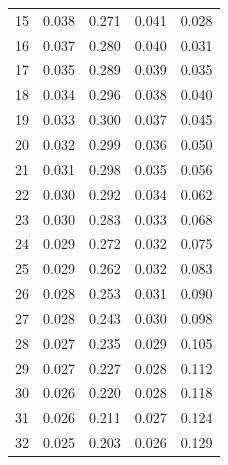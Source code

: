 \documentclass[letterpaper,12pt]{article}
\begin{document}
\begin{table}
\begin{center}
\begin{tabular}{ccccc}
         15        &         0.038               &    0.271  &            0.041                   &  0.028\\
         16         &         0.037               &    0.280  &            0.040                  &  0.031\\
         17        &         0.035               &    0.289  &            0.039                  & 0.035\\
         18        &         0.034               &    0.296  &            0.038                  & 0.040\\
         19         &         0.033               &    0.300  &            0.037                 & 0.045\\
         20        &         0.032               &    0.299  &             0.036                 & 0.050\\
         21        &         0.031               &    0.298  &             0.035                  & 0.056\\
         22         &         0.030               &    0.292  &            0.034                  & 0.062\\
         23        &         0.030               &    0.283  &             0.033                 & 0.068\\
         24        &         0.029               &    0.272  &            0.032                  & 0.075\\
         25         &         0.029               &    0.262  &            0.032                  & 0.083\\
         26        &         0.028               &    0.253  &             0.031                 & 0.090\\
         27        &         0.028               &    0.243  &           0.030                   & 0.098\\
         28        &         0.027               &    0.235  &           0.029                   & 0.105\\
         29        &         0.027               &    0.227  &            0.028                  & 0.112\\
         30         &         0.026               &    0.220  &            0.028                  & 0.118\\
         31        &         0.026               &    0.211  &            0.027                  & 0.124\\
         32        &         0.025               &    0.203  &            0.026                  & 0.129\\

\end{tabular}
\end{center}
\end{table}
\end{document}
